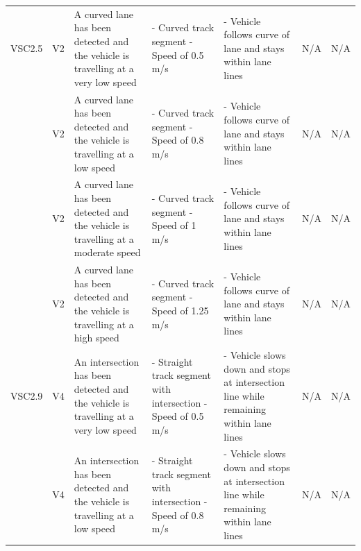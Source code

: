 \documentclass [10pt]{article}
\begin{document}
\begin{longtable}{ | p{ } | p{ } |  p{ } |  p{ } | p{ } | p{ } |  p{ } |}
    \multicolumn{1}{|c|}{VSC2.5} 
    & \multicolumn{1}{c|}{V2}
    & A curved lane has been detected and the vehicle is travelling at a very low speed
    & - Curved track segment \newline - Speed of 0.5 m/s
    & - Vehicle follows curve of lane and stays within lane lines
    & N/A
    & \multicolumn{1}{c|}{N/A}\\ 
    
    \rowcolor{tableCell}\multicolumn{1}{|c|}{VSC2.6} 
    & \multicolumn{1}{c|}{V2}
    & A curved lane has been detected and the vehicle is travelling at a low speed
    & - Curved track segment \newline - Speed of 0.8 m/s
    & - Vehicle follows curve of lane and stays within lane lines
    & N/A
    & \multicolumn{1}{c|}{N/A}\\ \hline
    
     \newpage \hline
     
     
    \multicolumn{1}{|c|}{VSC2.7} 
    & \multicolumn{1}{c|}{V2}
    & A curved lane has been detected and the vehicle is travelling at a moderate speed
    & - Curved track segment \newline - Speed of 1 m/s
    & - Vehicle follows curve of lane and stays within lane lines
    & N/A 
    & \multicolumn{1}{c|}{N/A}\\ 
    
   
    
    \rowcolor{tableCell}\multicolumn{1}{|c|}{VSC2.8} 
    & \multicolumn{1}{c|}{V2}
    & A curved lane has been detected and the vehicle is travelling at a high speed
    & - Curved track segment \newline - Speed of 1.25 m/s
    & - Vehicle follows curve of lane and stays within lane lines
    & N/A
    & \multicolumn{1}{c|}{N/A}\\ 
    
    \multicolumn{1}{|c|}{VSC2.9} 
    & \multicolumn{1}{c|}{V4}
    & An intersection has been detected and the vehicle is travelling at a very low speed
    & - Straight track segment with intersection \newline - Speed of 0.5 m/s
    & - Vehicle slows down and stops at intersection line while remaining within lane lines
    & N/A
    & \multicolumn{1}{c|}{N/A}\\ 
    
    \rowcolor{tableCell}\multicolumn{1}{|c|}{VSC2.10} 
    & \multicolumn{1}{c|}{V4}
    & An intersection has been detected and the vehicle is travelling at a low speed
    & - Straight track segment with intersection \newline - Speed of 0.8 m/s
    & - Vehicle slows down and stops at intersection line while remaining within lane lines
    & N/A
    & \multicolumn{1}{c|}{N/A}\\ 
    

\end{longtable}
\end{document}
